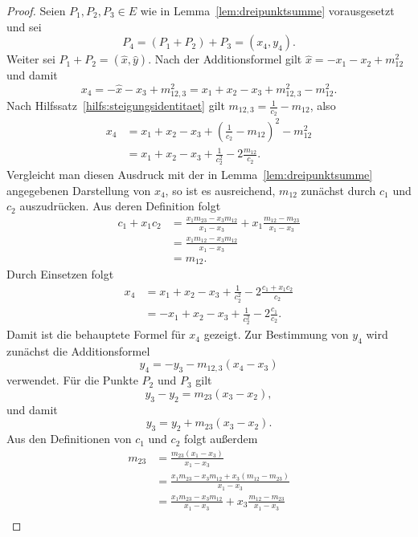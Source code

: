 \begin{proof}
    Seien $P_1,P_2,P_3\in E$ wie in Lemma~\ref{lem:dreipunktsumme} vorausgesetzt und sei
    \[
        P_4=(P_1+P_2)+P_3=(x_4,y_4).
    \]
    Weiter sei $P_1+P_2=(\hat{x},\hat{y})$. Nach der Additionsformel gilt
    $\hat{x}=-x_1-x_2+m_{12}^2$ und damit
    \[
        x_4=-\hat{x}-x_3+m_{12,3}^2
        =x_1+x_2-x_3+m_{12,3}^2-m_{12}^2.
    \]
    Nach Hilfssatz~\ref{hilfs:steigungsidentitaet} gilt
    $m_{12,3}=\frac{1}{c_2}-m_{12}$, also
    \[
        \begin{aligned}
            x_4
             & =x_1+x_2-x_3+{\left(\frac{1}{c_2}-m_{12}\right)}^2-m_{12}^2 \\
             & =x_1+x_2-x_3+\frac{1}{c_2^2}-2\frac{m_{12}}{c_2}.
        \end{aligned}
    \]
    Vergleicht man diesen Ausdruck mit der in Lemma~\ref{lem:dreipunktsumme} angegebenen Darstellung von $x_4$, so ist es ausreichend, $m_{12}$ zunächst durch $c_1$ und $c_2$  auszudrücken. Aus deren Definition folgt
    \begin{align*}
        c_1+x_1c_2
         & =\frac{x_1m_{23}-x_3m_{12}}{x_1-x_3}
        +x_1\frac{m_{12}-m_{23}}{x_1-x_3}       \\
         & =\frac{x_1m_{12}-x_3m_{12}}{x_1-x_3} \\
         & =m_{12}.
    \end{align*}
    Durch Einsetzen folgt
    \begin{align*}
        x_4
         & =x_1+x_2-x_3+\frac{1}{c_2^2}
        -2\frac{c_1+x_1c_2}{c_2}         \\
         & =-x_1+x_2-x_3+\frac{1}{c_2^2}
        -2\frac{c_1}{c_2}.
    \end{align*}
    Damit ist die behauptete Formel für $x_4$ gezeigt. Zur Bestimmung von $y_4$ wird zunächst die Additionsformel
    \[
        y_4=-y_3-m_{12,3}(x_4-x_3)
    \]
    verwendet. Für die Punkte $P_2$ und $P_3$ gilt
    \[
        y_3-y_2=m_{23}(x_3-x_2),
    \]
    und damit
    \[
        y_3=y_2+m_{23}(x_3-x_2).
    \]
    Aus den Definitionen von $c_1$ und $c_2$ folgt außerdem
    \begin{align*}
        m_{23}
         & =\frac{m_{23}(x_1-x_3)}{x_1-x_3}                        \\
         & =\frac{x_1m_{23}-x_3m_{12}+x_3(m_{12}-m_{23})}{x_1-x_3} \\
         & =\frac{x_1m_{23}-x_3m_{12}}{x_1-x_3}
        +x_3\frac{m_{12}-m_{23}}{x_1-x_3}                          \\

\end{align*}
\end{proof}
